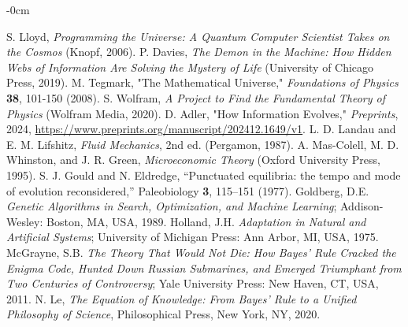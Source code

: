 \documentclass[entropy,article,submit,pdftex,oneauthor]{Definitions/mdpi}
\begin{document}
\begin{adjustwidth}{-\extralength}{0cm}


\begin{thebibliography}{999}
     S. Lloyd, \textit{Programming the Universe: A Quantum Computer Scientist Takes on the Cosmos} (Knopf, 2006).
     P. Davies, \textit{The Demon in the Machine: How Hidden Webs of Information Are Solving the Mystery of Life} (University of Chicago Press, 2019).
     M. Tegmark, "The Mathematical Universe," \textit{Foundations of Physics} \textbf{38}, 101-150 (2008).
     S. Wolfram, \textit{A Project to Find the Fundamental Theory of Physics} (Wolfram Media, 2020).
     D. Adler, "How Information Evolves," \textit{Preprints}, 2024, \url{https://www.preprints.org/manuscript/202412.1649/v1}.
     L. D. Landau and E. M. Lifshitz, \textit{Fluid Mechanics}, 2nd ed. (Pergamon, 1987).
     A. Mas-Colell, M. D. Whinston, and J. R. Green, \textit{Microeconomic Theory} (Oxford University Press, 1995).
    S. J. Gould and N. Eldredge, ``Punctuated equilibria: the tempo and mode of evolution reconsidered,'' Paleobiology \textbf{3}, 115–151 (1977).
    Goldberg, D.E. \textit{Genetic Algorithms in Search, Optimization, and Machine Learning}; Addison-Wesley: Boston, MA, USA, 1989.
    Holland, J.H. \textit{Adaptation in Natural and Artificial Systems}; University of Michigan Press: Ann Arbor, MI, USA, 1975.
    McGrayne, S.B. \textit{The Theory That Would Not Die: How Bayes' Rule Cracked the Enigma Code, Hunted Down Russian Submarines, and Emerged Triumphant from Two Centuries of Controversy}; Yale University Press: New Haven, CT, USA, 2011.
     N. Le, \textit{The Equation of Knowledge: From Bayes’ Rule to a Unified Philosophy of Science}, Philosophical Press, New York, NY, 2020.

\end{thebibliography}
\end{adjustwidth}
\end{document}
